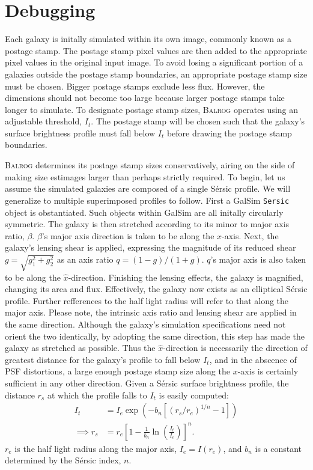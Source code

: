 \documentclass[12pt]{book}
\newcommand{\codett}[1]{\lstinline{#1}}
\newcommand{\galsim}{GalSim}
\newcommand{\balrog}{\textsc{Balrog}}
\newcommand{\sersic}{S\'{e}rsic}
\begin{document}
\outtab{}

\chapter{Debugging}
\label{sec:debug}

Each galaxy is initally simulated within its own image, commonly known as a postage stamp.
The postage stamp pixel values are then added to the appropriate pixel values in the original input image.
To avoid losing a significant portion of a galaxies outside the postage stamp boundaries,
an appropriate postage stamp size must be chosen. 
Bigger postage stamps exclude less flux.
However, the dimensions should not become too large because
larger postage stamps take longer to simulate.
To designate postage stamp sizes, \balrog{} operates using an adjustable threshold, $I_t$.
The postage stamp will be chosen such that the galaxy's surface brightness profile
must fall below $I_t$ before drawing the postage stamp boundaries.

\balrog{} determines its postage stamp sizes conservatively,
airing on the side of making size estimages larger than perhaps strictly required.
To begin, let us assume the simulated galaxies are composed of a single \sersic{} profile.
We will generalize to multiple superimposed profiles to follow.
First a \galsim{} \codett{Sersic} object is obstantiated.
Such objects within \galsim{} are all initally circularly symmetric. 
The galaxy is then stretched according to its minor to major axis ratio, $\beta$.
$\beta$'s major axis direction is taken to be along the $x$-axis.
Next, the galaxy's lensing shear is applied, expressing the magnitude of its reduced shear 
\mbox{$g = \sqrt{ g_1^2 + g_2^2}$}
as an axis ratio
\mbox{$q = (1-g)/(1+g)$}.
$q$'s major axis is also taken to be along the $\hat{x}$-direction.
Finishing the lensing effects, the galaxy is magnified, changing its area and flux.
Effectively, the galaxy now exists as an elliptical \sersic{} profile.
Further refferences to the half light radius will refer to that along the major axis.
Please note, the intrinsic axis ratio and lensing shear are applied in the same direction. 
Although the galaxy's simulation specifications need not orient the two identically,
by adopting the same direction, this step has made the galaxy as stretched as possible.
Thus the $\hat{x}$-direction is necessarily the direction of greatest distance for the galaxy's profile to fall below $I_t$,
and in the abscence of PSF distortions, a large enough postage stamp size along the $x$-axis is certainly 
sufficient in any other direction. Given a \sersic{} surface brightness profile, the distance $r_s$ at which the profile
falls to $I_t$ is easily computed:
\begin{align}
I_t &= I_e \exp \left( -b_n \left[\left( r_s/r_e  \right)^{1/n} -1 \right] \right) \label{eq:sersic} \\
\implies r_s &= r_e \left[1 - \frac{1}{b_n}  \ln \left(\frac{I_t}{ I_e}\right) \right]^n. \label{eq:rt}
\end{align}
$r_e$ is the half light radius along the major axis, 
$I_e = I\left(r_e\right)$,
and $b_n$ is a constant determined by the \sersic{} index, $n$.
\end{document}
